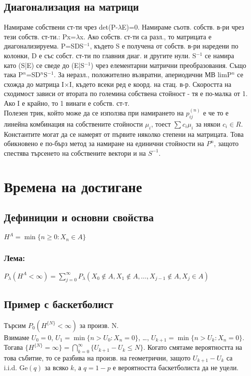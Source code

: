 \documentclass{article}
\begin{document}
\subsection{Диагонализация на матрици}
Намираме собствени ст-ти чрез det(P-$\lambda$E)=0. Намираме съотв. собств. в-ри чрез тези собств. ст-ти.: Px=$\lambda$x.
Ако собств. ст-ти са разл., то матрицата е диагонализируема.
P=SDS$^{-1}$, където S е получена от собств. в-ри наредени по колонки, D е със собст. ст-ти по главния диаг. и другите нули. 
S$^{-1}$ се намира като (S|E) се сведе до (E|S$^{-1}$) чрез елементарни матрични преобразования. 
Също така P$^n$=SD$^n$S$^{-1}$. За неразл., положително възвратни, апериодични МВ limP$^n$ се схожда до матрица I$\times$I, където всеки ред е коорд. на стац. в-р. 
Скоростта на сходимост зависи от втората по големина собствена стойност - тя е по-малка от 1. 
Ако I е крайно, то 1 винаги е собств. ст-т. \\
Полезен трик, който може да се използва при намирането на $p_{ij}^{(n)}$ е че то е линейна комбинация на собствените стойности $\mu_i$, тоест $\sum c_i\mu_i$ за някои $c_i\in R$. Константите могат да се намерят от първите няколко степени на матрицата. Това обикновено е по-бърз метод за намиране на единични стойности на $P^n$, защото спестява търсенето на собствените вектори и на $S^{-1}$.

\section{Времена на достигане}
\subsection{Дефиниции и основни свойства}
$H^A = \min\{n \geq 0 : X_n \in A\}$

\subsubsection*{Лема:}
$P_\lambda(H^A < \infty) = \sum_{j=0}^\infty P_\lambda(X_0 \notin A, X_1 \notin A, \dots, X_{j-1} \notin A, X_j \in A)$

\subsection{Пример с баскетболист}
Търсим $P_0(H^{\{N\}} < \infty)$ за произв. N. \\
Взимаме $U_0 = 0$, $U_1 = \min\{n > U_0 : X_n = 0\}$, \dots, $U_{k+1} = \min\{n > U_k : X_n = 0\}$. 
Тогава $\{H^{\{N\}} = \infty\} = \bigcap_{k=0}^\infty \{U_{k+1} - U_k \leq N\}$. 
Когато смятаме вероятността на това събитие, то се разбива на произв. на геометрични, защото 
$U_{k+1} - U_k$ са i.i.d. $\mathrm{Ge}(q)$ за всяко $k$, а $q = 1 - p$ е вероятността баскетболиста да не уцели.
\end{document}
